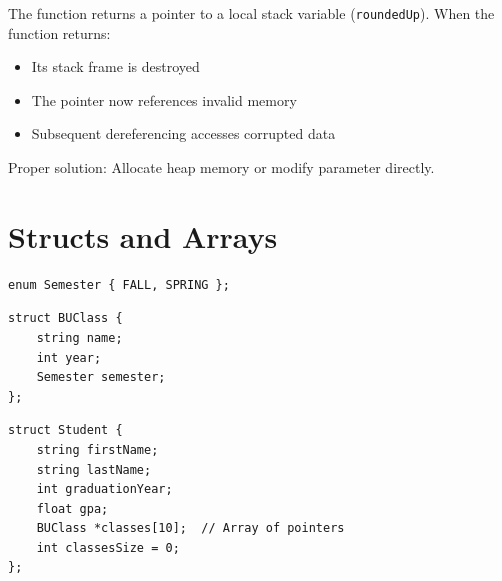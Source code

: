\documentclass{report}
\begin{document}

\sol
The function returns a pointer to a local stack variable (\texttt{roundedUp}). When the function returns:
\begin{itemize}
	\item Its stack frame is destroyed
	\item The pointer now references invalid memory
	\item Subsequent dereferencing accesses corrupted data
\end{itemize}
Proper solution: Allocate heap memory or modify parameter directly.

\section{Structs and Arrays}

\begin{verbatim}
enum Semester { FALL, SPRING };
\end{verbatim}


\begin{verbatim}
struct BUClass {
    string name;
    int year;
    Semester semester;
};
\end{verbatim}


\begin{verbatim}
struct Student {
    string firstName;
    string lastName;
    int graduationYear;
    float gpa;
    BUClass *classes[10];  // Array of pointers
    int classesSize = 0;
};
\end{verbatim}
\end{document}

